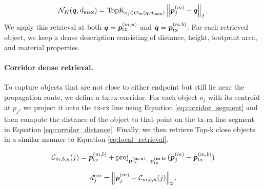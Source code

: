 \begin{equation}
\mathcal{N}_{K}(\boldsymbol{q}, d_{\max})
=
\operatorname{TopK}_{o_j \in \mathcal{O}_{m}(\boldsymbol{q}, d_{\max})}
\left\|
\boldsymbol{p}^{(m)}_j-\boldsymbol{q}
\right\|_2 .
\label{eq:local_retrieval}
\end{equation}
We apply this retrieval at both $\boldsymbol{q}=\boldsymbol{p}^{(m,u)}_{\mathrm{rx}}$ and $\boldsymbol{q}=\boldsymbol{p}^{(m,b)}_{\mathrm{tx}}$. For each retrieved object, we keep a dense description consisting of distance, height, footprint area, and material properties. 



\paragraph{Corridor dense retrieval.}
To capture objects that are not close to either endpoint but still lie near the propagation route, we define a tx-rx corridor. For each object $o_j$ with its centroid at $p_{j}$, we project it onto the tx-rx line using Equation \ref{eq:corridor_segment} and then compute the distance of the object to that point on the tx-rx line segment in Equation \ref{eq:corridor_distance}. Finally, we then retrieve Top-k close objects in a similar manner to Equation \ref{eq:local_retrieval}.

\begin{equation}
\mathcal{C}_{m,b,u}(j)
=
\boldsymbol{p}^{(m,b)}_{\mathrm{tx}}
+
\text{proj}_{\mathbf{\boldsymbol{p}^{(m,u)}_{\mathrm{rx}}-\boldsymbol{p}^{(m,b)}_{\mathrm{tx}}}} (\boldsymbol{p}^{(m)}_j-\boldsymbol{p}^{(m,b)}_{\mathrm{tx}} )
\label{eq:corridor_segment}
\end{equation}

\begin{equation}
d^{\mathrm{cor}}_j
=
\left\|
\boldsymbol{p}^{(m)}_j-\mathcal{C}_{m,b,u}(j)
\right\|_2.
\label{eq:corridor_distance}
\end{equation}

